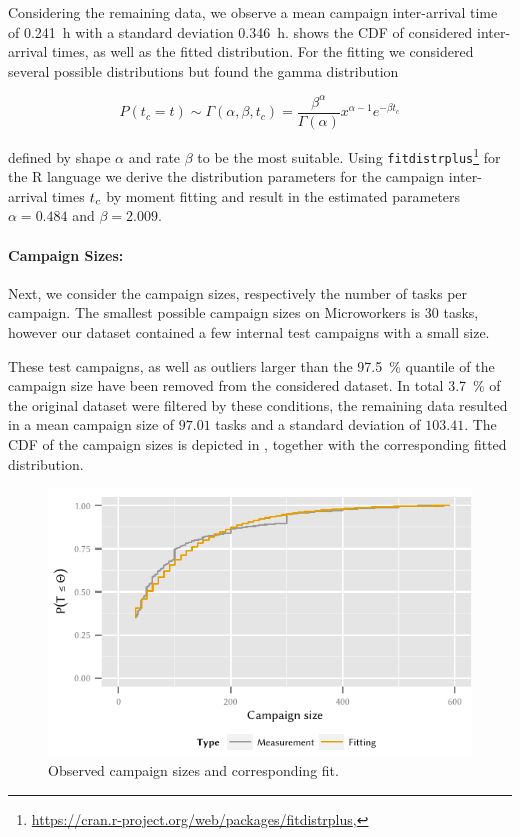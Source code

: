 Considering the remaining data, we observe a mean campaign inter-arrival time of \SI{0.241}{\hour} with a standard deviation \SI{0.346}{\hour}.
 shows the \gls{CDF} of considered inter-arrival times, as well as the fitted distribution.
For the fitting we considered several possible distributions but found the gamma distribution 

\[
P(t_c=t) \sim \Gamma(\alpha,\beta,t_c) = \frac{\beta^\alpha}{\Gamma(\alpha)} x^{\alpha-1} e^{-{\beta}t_c}
\]

defined by shape \(\alpha\) and rate \(\beta\) to be the most suitable.
Using \texttt{fitdistrplus}\footnote{\url{https://cran.r-project.org/web/packages/fitdistrplus}, \accessed} for the R language we derive the distribution parameters for the campaign inter-arrival times \(t_c\) by moment fitting and result in the estimated parameters \(\alpha=0.484\) and \(\beta=2.009\).

\paragraph*{Campaign Sizes:}Next, we consider the campaign sizes, respectively the number of tasks per campaign.
The smallest possible campaign sizes on Microworkers is \(30\) tasks, however our dataset contained a few internal test campaigns with a small size.

These test campaigns, as well as outliers larger than the \SI{97.5}{\percent} quantile of the campaign size have been removed from the considered dataset.
In total \SI{3.7}{\percent} of the original dataset were filtered by these conditions, the remaining data resulted in a mean campaign size of \(97.01\) tasks and a standard deviation of \(103.41\).
The \gls{CDF} of the campaign sizes \campaignSize is depicted in , together with the corresponding fitted distribution.

\begin{figure}
  \centering
  \includegraphics{cloud/crowdsourcing/measurements/figures/campaign_sizes}
  \caption{Observed campaign sizes \campaignSize and corresponding fit.}
  \label{fig:cloud:crowdsourcing:measurements:parameters:campaign_sizes}
\end{figure}

